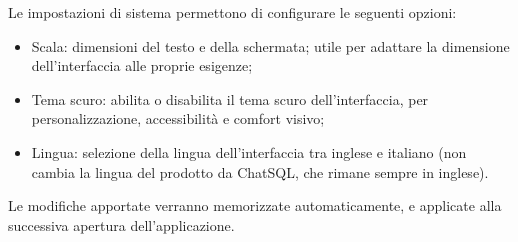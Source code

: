 \par Le impostazioni di sistema permettono di configurare le seguenti opzioni:
\begin{itemize}
  \item Scala: dimensioni del testo e della schermata; utile per adattare la dimensione dell'interfaccia alle proprie esigenze;
  \item Tema scuro: abilita o disabilita il tema scuro dell'interfaccia, per personalizzazione, accessibilità e comfort visivo;
  \item Lingua: selezione della lingua dell'interfaccia tra inglese e italiano (non cambia la lingua del  prodotto da ChatSQL, che rimane sempre in inglese).
\end{itemize}
\par Le modifiche apportate verranno memorizzate automaticamente, e applicate alla successiva apertura dell'applicazione.